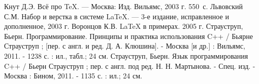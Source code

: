 \documentclass[12pt,a4paper]{scrartcl}
\begin{document}
	\begin{thebibliography}{9}
	Кнут Д.Э. Всё про \TeX. \newblock --- Москва: Изд. Вильямс, 2003 г. 550~с.
	Львовский С.М. Набор и верстка в системе \LaTeX{}. \newblock --- 3-е издание, исправленное и дополненное, 2003 г.
	Воронцов К.В. \LaTeX{} в примерах. 2005 г.
	Страуструп, Бьерн. Программирование. Принципы и практика использования C++ / Бьярне Страуструп ; [пер. с англ. и ред. Д. А. Клюшина]. - Москва [и др.] : Вильямс, 2011. - 1238 с. : ил., табл.; 24 см.
	Страуструп, Бьерн. Язык программирования C++ / Бьерн Страуструп ; пер. с англ. под ред. Н. Н. Мартынова. - Спец. изд. - Москва : Бином, 2011. - 1135 с. : ил.; 24 см.

	\end{thebibliography}
	
\end{document}

